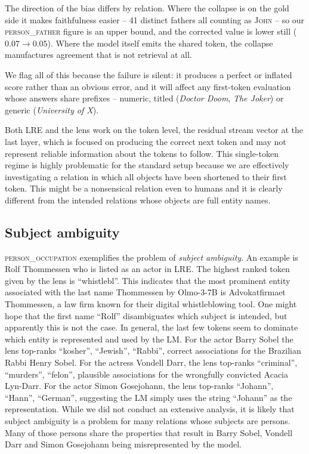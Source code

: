 \documentclass[11pt]{article}
\begin{document}
The direction of the bias differs by relation. Where the collapse is on
the gold side it makes faithfulness easier -- 41 distinct fathers all
counting as \textsc{John} -- so our \textsc{person\_father} figure is an
upper bound, and the corrected value is lower still ($0.07 \to 0.05$).
Where the model itself emits the shared token, the collapse manufactures
agreement that is not retrieval at all.

We flag all of this because the failure is silent: it produces a perfect
or inflated score rather than an obvious error, and it will affect any
first-token evaluation whose answers share prefixes -- numeric,
titled (\emph{Doctor Doom}, \emph{The Joker}) or generic
(\emph{University of X}).



Both LRE and the lens work on the token level, the residual
stream vector at the last layer, which is focused on
producing the correct next token and may not represent
reliable information about the tokens to follow. This
single-token regime is highly problematic for the standard
setup because we are effectively investigating a relation in
which all objects have been shortened to their first
token. This might be a nonsensical relation even to humans
and it is clearly different from the intended relations
whose objects are full entity names.



\subsection{Subject ambiguity}


\textsc{person\_occupation} exemplifies the problem of 
\emph{subject ambiguity}. An example is Rolf Thommessen
who is listed as an actor
in LRE. The highest ranked token given by the lens is
``whistlebl''. This indicates that the most prominent entity
associated with the last name Thommessen
by Olmo-3-7B
is Advokatfirmaet
Thommessen, a law firm known for their digital whistleblowing
tool. One might hope that the first name ``Rolf''
disambiguates which subject is intended, but apparently this
is not the case. In general, the last few tokens seem to
dominate which entity is represented and used by the LM. For the actor Barry Sobel the lens top-ranks
``kosher'', ``Jewish'', ``Rabbi'', correct associations for
the Brazilian Rabbi Henry Sobel. For the actress Vondell
Darr, the lens top-ranks ``criminal'', ``murders'',
``felon'', plausible associations for the wrongfully convicted
Acacia Lyn-Darr.  For the actor Simon Gosejohann, the lens
top-ranks ``Johann'', ``Hann'', ``German'', suggesting the LM
simply uses the string ``Johann'' as the representation.
While we did not conduct an extensive analysis, it is likely
that subject ambiguity is a problem for many relations whose
subjects are persons. Many of those persons share the
properties that result in Barry Sobel, Vondell Darr
and Simon Gosejohann being misrepresented by the model.
\end{document}
